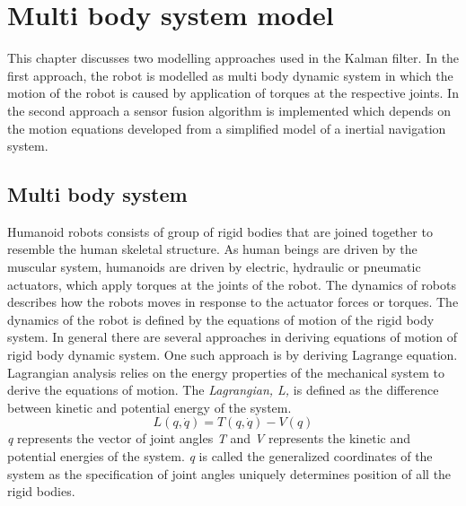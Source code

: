 %
\chapter{Multi body system model}
\label{chap:multi_mdl}
This chapter discusses two modelling approaches used in the Kalman filter.
In the first approach, the robot is modelled as multi body dynamic system in which the motion of the robot is caused by application of torques at the respective joints.
In the second approach a sensor fusion algorithm is implemented which depends on the motion equations developed from a simplified model of a inertial navigation system.
\section{Multi body system}
Humanoid robots consists of group of rigid bodies that are joined together to resemble the human skeletal structure. As human beings are driven by the muscular system, humanoids are driven by electric, hydraulic or pneumatic actuators, which apply torques at the joints of the robot. The dynamics of robots describes how the robots moves in response to the actuator forces or torques. The dynamics of the robot is defined by the  equations of motion of the rigid body system. In general there are several approaches in deriving equations of motion of rigid body dynamic system. One such approach is by deriving Lagrange equation. Lagrangian analysis relies on the energy properties of the mechanical system to derive the equations of motion. The \emph{Lagrangian, L,} is defined as the difference between kinetic and potential energy of the system. $$ L(q,\dot{q}) = T(q,\dot{q}) - V(q)$$ \emph{q} represents the vector of joint angles \emph{T} and \emph{V} represents the kinetic and potential energies of the system. \emph{q} is called the generalized coordinates of the system as the specification of joint angles uniquely determines position of all the rigid bodies.

